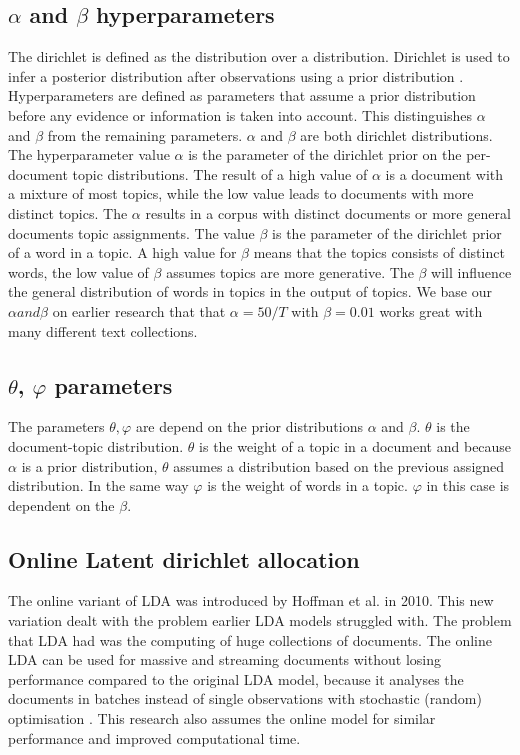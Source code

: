 \subsection{$\alpha$ and $\beta$ hyperparameters}  \label{lda:alphabeta}
The dirichlet is defined as the distribution over a distribution. Dirichlet is used to infer a posterior distribution after observations using a prior distribution \cite{Sethuraman2001APRIORS}. Hyperparameters are defined as parameters that assume a prior distribution before any evidence or information is taken into account. This distinguishes $\alpha$ and $\beta$ from the remaining parameters. $\alpha$ and $\beta$ are both dirichlet distributions. The hyperparameter value $\alpha$ is the parameter of the dirichlet prior on the per-document topic distributions. The result of a high value of $\alpha$ is a document with a mixture of most topics, while the low value leads to documents with more distinct topics. The $\alpha$ results in a corpus with distinct documents or more general documents topic assignments. The value $\beta$ is the parameter of the dirichlet prior of a word in a topic. A high value for $\beta$ means that the topics consists of distinct words, the low value of $\beta$ assumes topics are more generative. The $\beta$ will influence the general distribution of words in topics in the output of topics. We base our $\alpha and \beta$ on earlier research that that $\alpha = 50/T$ with $\beta = 0.01$ works great with many different text collections.

\subsection{$\theta$, $\varphi$ parameters}\label{lda:thetavarphi}
The parameters $\theta, \varphi$ are depend on the prior distributions $\alpha$ and $\beta$. $\theta$ is the document-topic distribution. $\theta$ is the weight of a topic in a document and because $\alpha$ is a prior distribution, $\theta$ assumes a distribution based on the previous assigned distribution. 
In the same way $\varphi$ is the weight of words in a topic. $\varphi$ in this case is dependent on the $\beta$.



\subsection{Online Latent dirichlet allocation} \label{lda:onlinelda}
The online variant of LDA was introduced  by Hoffman et al. in 2010.\cite{Hoffman2010OnlineAllocation} This new variation dealt with the problem earlier LDA models struggled with. The problem that LDA had was the computing of huge collections of documents. The online LDA can be used for massive and streaming documents without losing performance compared to the original LDA model, because it analyses the documents in batches instead of single observations with stochastic (random) optimisation \cite{Beaver2012}. This research also assumes the online model for similar performance and improved computational time.

